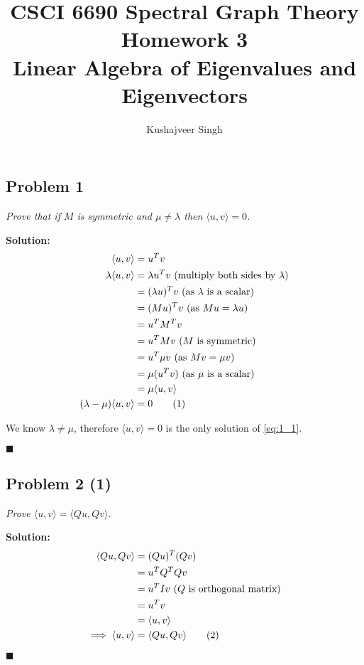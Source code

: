 \documentclass[12pt,a4paper]{article}
\title{CSCI 6690 Spectral Graph Theory Homework 3\\Linear Algebra of Eigenvalues and Eigenvectors}
\author{Kushajveer Singh}
\date{}
\newcommand\numberthis{\addtocounter{equation}{1}\tag{\theequation}}
\newcommand{\rightqed}{
\begin{flushright}
$\blacksquare$
\end{flushright}
}
\newcommand{\solution}{\noindent\textbf{Solution:}\\}
\begin{document}
\maketitle

\subsection*{Problem 1}
\textit{
    Prove that if $M$ is symmetric and $\mu \neq \lambda$ then $\langle u,v\rangle = 0$.
}

\solution
\begin{align*}
    \langle u, v \rangle &= u^Tv \\
    \lambda \langle u, v \rangle &= \lambda u^Tv \text{ (multiply both sides by $\lambda$)} \\
                                 &= (\lambda u)^Tv \text{ (as $\lambda$ is a scalar)}\\
                                 &= (Mu)^Tv \text{ (as $Mu = \lambda u$)} \\
                                 &= u^TM^Tv \\
                                 &= u^TMv \text{ ($M$ is symmetric)} \\
                                 &= u^T\mu v \text{ (as $Mv = \mu v$)} \\
                                 &= \mu (u^Tv) \text{ (as $\mu$ is a scalar)}\\
                                 &= \mu \langle u, v \rangle \\
    (\lambda - \mu)\langle u, v \rangle &= 0 \numberthis \label{eq:1_1}
\end{align*}

We know $\lambda \neq \mu$, therefore $\langle u, v \rangle = 0$ is the only solution of \eqref{eq:1_1}.

\rightqed

\newpage
\subsection*{Problem 2 (1)}
\textit{
    Prove $\langle u, v \rangle = \langle Qu, Qv \rangle$.
}

\solution
\begin{align*}
    \langle Qu, Qv \rangle &= (Qu)^T(Qv) \\
                           &= u^TQ^TQv \\ 
                           &= u^TIv \text{ ($Q$ is orthogonal matrix)}\\
                           &= u^Tv \\
                           &= \langle u, v \rangle \\
    \implies \langle u, v \rangle &= \langle Qu, Qv \rangle \numberthis
\end{align*}
\rightqed
\end{document}
